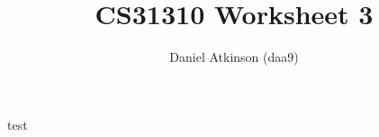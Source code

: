 \documentclass[11pt]{article}
\begin{document}
\title{CS31310 Worksheet 3}

\author{Daniel Atkinson (daa9)}

test

\end{document}
